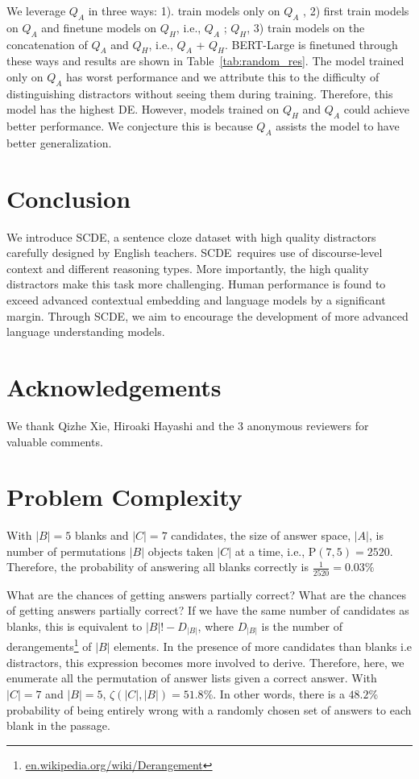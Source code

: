 \documentclass[11pt,a4paper]{article}
\newcommand{\dsname}{\textsc{SCDE}}
\begin{document}
We leverage $Q_{A}$ in three ways: 1). train models only on $Q_{A}$ , 2) first train models on $Q_{A}$ and finetune models on $Q_{H}$, i.e., $Q_{A}$ ; $Q_{H}$, 3) train models on the concatenation of $Q_{A}$ and $Q_{H}$, i.e., $Q_{A}$ + $Q_{H}$. BERT-Large is finetuned through these ways and results are shown in Table~\ref{tab:random_res}. The model trained only on $Q_{A}$ has worst performance and we attribute this to the difficulty of distinguishing distractors without seeing them during training. Therefore, this model has the highest DE. However, models trained on $Q_{H}$ and $Q_{A}$ could achieve better performance. We conjecture this is because $Q_{A}$ assists the model to have better generalization. 

 

\section{Conclusion}
\label{sec:conclusions}
We introduce \dsname, a sentence cloze dataset with high quality distractors carefully designed by English teachers. \dsname~requires use of discourse-level context and different reasoning types. More importantly, the high quality distractors make this task more challenging. Human performance is found to exceed advanced contextual embedding and language models by a significant margin. Through \dsname, we aim to encourage the development of more advanced language understanding models.
 \section{Acknowledgements}
We thank Qizhe Xie, Hiroaki Hayashi and the 3 anonymous reviewers for valuable comments.
\newpage


\clearpage
\newpage
\section{Problem Complexity}
With $|B|=5$ blanks and $|C|=7$ candidates, the size of answer space, $|A|$, is number of permutations $|B|$ objects taken $|C|$ at a time, i.e., $\textrm{P}(7,5)=2520$. Therefore, the probability of answering all blanks correctly is $\frac{1}{2520}=0.03\%$

What are the chances of getting answers partially correct? What are the chances of getting answers partially correct? If we have the same number of candidates as blanks, this is equivalent to $|B|! - D_{|B|}$, where $D_{|B|}$ is the number of derangements\footnote{\url{en.wikipedia.org/wiki/Derangement}} of $|B|$ elements. In the presence of more candidates than blanks i.e distractors, this expression becomes more involved to derive. Therefore, here, we enumerate all the permutation of answer lists given a correct answer. With $|C|=7$ and $|B|=5$, $\zeta(|C|,|B|)=51.8\%$. In other words, there is a $48.2$\% probability of being entirely wrong with a randomly chosen set of answers to each blank in the passage.
\end{document}
